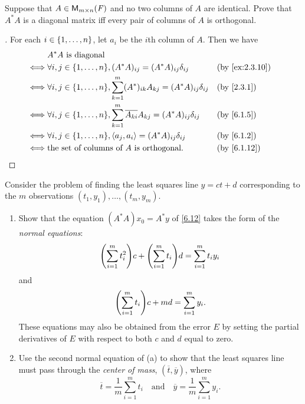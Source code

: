\begin{ex}\label{ex:6.3.19}
	Suppose that \(A \in \mathsf{M}_{{m} \times n}({\mathit{F}})\) and no two columns of \(A\) are identical.
	Prove that \(A^* A\) is a diagonal matrix iff every pair of columns of \(A\) is orthogonal.
\end{ex}

\begin{proof}[]
	For each \(i \in \left\lbrace1, \dots, n\right\rbrace\), let \(a_i\) be the \(i\)th column of \(A\).
	Then we have
	\begin{align*}
		     & A^* A \text{ is diagonal}                                                                                                  \\
		\iff & \forall i, j \in \set{1, \dots, n}, (A^* A)_{i j} = (A^* A)_{i j} \delta_{i j}                         &  & \by{ex:2.3.10} \\
		\iff & \forall i, j \in \set{1, \dots, n}, \sum_{k = 1}^m (A^*)_{i k} A_{k j} = (A^* A)_{i j} \delta_{i j}    &  & \by{2.3.1}     \\
		\iff & \forall i, j \in \set{1, \dots, n}, \sum_{k = 1}^m \conj{A_{k i}} A_{k j} = (A^* A)_{i j} \delta_{i j} &  & \by{6.1.5}     \\
		\iff & \forall i, j \in \set{1, \dots, n}, \inn{a_j, a_i} = (A^* A)_{i j} \delta_{i j}                        &  & \by{6.1.2}     \\
		\iff & \text{the set of columns of } A \text{ is orthogonal}.                                                 &  & \by{6.1.12}
	\end{align*}
\end{proof}

\setcounter{ex}{22}
\begin{ex}\label{ex:6.3.23}
	Consider the problem of finding the least squares line \(y = ct + d\) corresponding to the \(m\) observations \((t_1, y_1), \dots, (t_m, y_m)\).
	\begin{enumerate}
		\item Show that the equation \((A^* A) x_0 = A^* y\) of \cref{6.12} takes the form of the \emph{normal equations}:
		      \[
			      \pa{\sum_{i = 1}^m t_i^2} c + \pa{\sum_{i = 1}^m t_i} d = \sum_{i = 1}^m t_i y_i
		      \]
		      and
		      \[
			      \pa{\sum_{i = 1}^m t_i} c + md = \sum_{i = 1}^m y_i.
		      \]
		      These equations may also be obtained from the error \(E\) by setting the partial derivatives of \(E\) with respect to both \(c\) and \(d\) equal to zero.
		\item Use the second normal equation of (a) to show that the least squares line must pass through the \emph{center of mass}, \((\overline{t}, \overline{y})\), where
		      \[
			      \overline{t} = \frac{1}{m} \sum_{i = 1}^m t_i \quad \text{and} \quad \overline{y} = \frac{1}{m} \sum_{i = 1}^m y_i.
		      \]
	\end{enumerate}
\end{ex}

